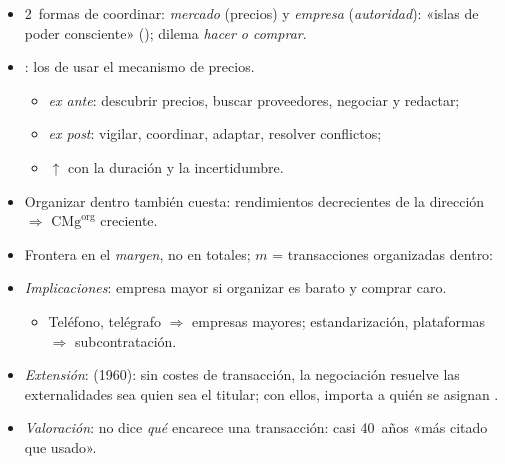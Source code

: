 \documentclass{article}
\begin{document}
\begin{columnas}
\begin{itemize}
\item 2~formas de coordinar: \emph{mercado} (precios) y \emph{empresa} (\emph{autoridad}): «islas de poder consciente» (); dilema \emph{hacer o comprar}.
\item {}: los de usar el mecanismo de precios.
  \begin{itemize}
  \item \emph{ex ante}: descubrir precios, buscar proveedores, negociar y redactar;
  \item \emph{ex post}: vigilar, coordinar, adaptar, resolver conflictos;
  \item $\uparrow$ con la duración y la incertidumbre.
  \end{itemize}
\item Organizar dentro también cuesta: rendimientos decrecientes de la dirección $\Rightarrow$ $\mathrm{CMg}^{\mathrm{org}}$ creciente.
\item Frontera en el \emph{margen}, no en totales; $m$ = transacciones organizadas dentro:
\end{itemize}
\begin{itemize}
\item \emph{Implicaciones}: empresa mayor si organizar es barato y comprar caro.
  \begin{itemize}
  \item Teléfono, telégrafo $\Rightarrow$ empresas mayores; estandarización, plataformas $\Rightarrow$ subcontratación.
  \end{itemize}
\item \emph{Extensión}:  (1960): sin costes de transacción, la negociación resuelve las externalidades sea quien sea el titular; con ellos, importa a quién se asignan .
\item \emph{Valoración}: no dice \emph{qué} encarece una transacción: casi 40~años «más citado que usado».
\end{itemize}


\end{columnas}
\end{document}
